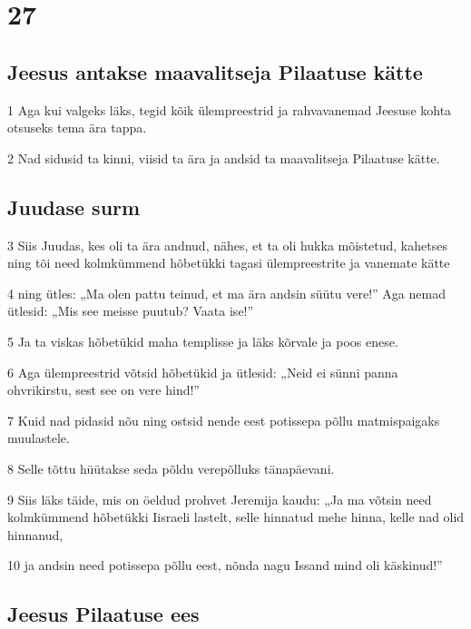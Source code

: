 \chapter{27}

\section*{Jeesus antakse maavalitseja Pilaatuse kätte}

\par 1 Aga kui valgeks läks, tegid kõik ülempreestrid ja rahvavanemad Jeesuse kohta otsuseks tema ära tappa.
\par 2 Nad sidusid ta kinni, viisid ta ära ja andsid ta maavalitseja Pilaatuse kätte.

\section*{Juudase surm}

\par 3 Siis Juudas, kes oli ta ära andnud, nähes, et ta oli hukka mõistetud, kahetses ning tõi need kolmkümmend hõbetükki tagasi ülempreestrite ja vanemate kätte
\par 4 ning ütles: „Ma olen pattu teinud, et ma ära andsin süütu vere!” Aga nemad ütlesid: „Mis see meisse puutub? Vaata ise!”
\par 5 Ja ta viskas hõbetükid maha templisse ja läks kõrvale ja poos enese.
\par 6 Aga ülempreestrid võtsid hõbetükid ja ütlesid: „Neid ei sünni panna ohvrikirstu, sest see on vere hind!”
\par 7 Kuid nad pidasid nõu ning ostsid nende eest potissepa põllu matmispaigaks muulastele.
\par 8 Selle tõttu hüütakse seda põldu verepõlluks tänapäevani.
\par 9 Siis läks täide, mis on öeldud prohvet Jeremija kaudu: „Ja ma võtsin need kolmkümmend hõbetükki Iisraeli lastelt, selle hinnatud mehe hinna, kelle nad olid hinnanud,
\par 10 ja andsin need potissepa põllu eest, nõnda nagu Issand mind oli käskinud!”

\section*{Jeesus Pilaatuse ees}


